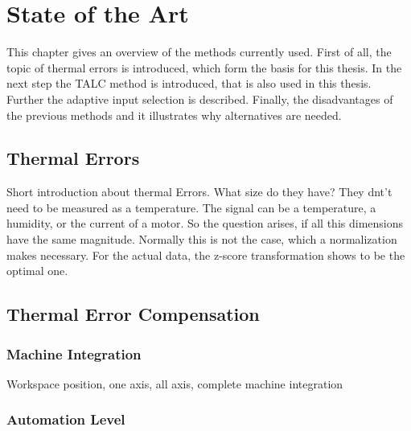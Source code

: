 \chapter{State of the Art}
\label{chp:stateoftheart}

This chapter gives an overview of the methods currently used. First of all, the topic of thermal errors is introduced, which form the basis for this thesis. In the next step the TALC method is introduced, that is also used in this thesis. Further the adaptive input selection is described. Finally, the disadvantages of the previous methods and it illustrates why alternatives are needed.

\section{Thermal Errors}
\label{sec:thermalerrors}

Short introduction about thermal Errors. What size do they have? They dnt't need  to be measured as a temperature. The signal can be a temperature, a humidity, or the current of a motor. So the question arises, if all this dimensions have the same magnitude. Normally this is not the case, which a normalization makes necessary. For the actual data, the z-score transformation shows to be the optimal one.






\section{Thermal Error Compensation}
\label{sec:neuronal_networks}

\subsection{Machine Integration}
\label{sec:Machine_Integration}

Workspace position, one axis, all axis, complete machine integration

\subsection{Automation Level}
\label{sec:Automation_Level}


